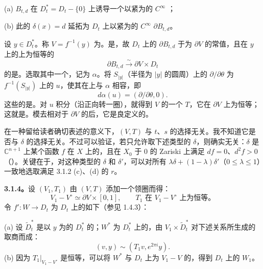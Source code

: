 (a) $B_{t,d}$ 在 $D_t^*=D_t-\{0\}$ 上诱导一个以紧为的 $C^\infty$ ；

(b) 此的 $\delta(x)=d$ 延拓为 $D_t$ 上以紧为的 $C^\infty$  $\partial B_{t,d}$。

设 $y\in D_t^*$。称 $V=f^{-1}(y)$ 为。是，故 $D_t$ 上的 $\partial B_{t,d}$ 于为 $\partial V$ 的常值，且在 $y$ 上的上为恒等的
\[
 \partial B_{t,d}\xrightarrow{\sim}\partial V\times D_t
\]
的是。选取其中一个，记为 $\alpha$。将 $S_{|y|}$（半径为 $|y|$ 的圆周）上的 $\partial/\partial\theta$ 为 $f^{-1}(S_{|y|})$ 上的 $u$，使其在上与 $\alpha$ 相容，即
\[
 d\alpha(u)=(\partial/\partial\theta,0).
\]
这些的是。对 $u$ 积分（沿正向转一圈），就得到 $V$ 的一个 $T$，它在 $\partial V$ 上为恒等；这就是。模去相对于 $\partial V$ 的后，它是良定义的。

在一种留给读者确切表述的意义下，$(V,T)$ 与 $t$、$s$ 的选择无关。我不知道它是否与 $\delta$ 的选择无关。不过可以验证，若只允许取下述类型的 $\delta$，则确实无关：$\delta$ 是 $\mathbb C^{n+1}$ 上某个函数 $f$ 在 $X$ 上的，且在 $X_0$ 于 $0$ 的 Zariski 上满足 $df=0$、$d^2f>0$（）。关键在于，对这种类型的 $\delta$ 和 $\delta'$，可以对所有 $\lambda\delta+(1-\lambda)\delta'$（$0\leq\lambda\leq1$）一致地选取满足 3.1.2 (c)、(d) 的 $r$。

\textbf{3.1.4。}设 $(V_1,T_1)$ 由 $(V,T)$ 添加一个领圈而得：
\[
 V_1-V^\circ\simeq\partial V\times[0,1],\qquad
 T_1\text{ 在 }V_1-V^\circ\text{ 上为恒等。}
\]
令 $f':W\to D_t$ 为 $D_t$ 上的如下（参见 1.4.3）：

(a) 设 $\widetilde D_t^*$ 是以 $y$ 为的 $D_t^*$ 的；$W^*$ 为 $D_t^*$ 上的，由 $V_1\times\widetilde D_t^*$ 对下述关系所生成的取商而成：
\[
 (v,y)\sim(T_1v,e^{2\pi i}y).
\]
(b) 因为 $T_1|_{V_1-V^\circ}$ 是恒等，可以将 $W^*$ 与 $D_t$ 上为 $V_1-V$ 的，得到 $D_t$ 上的 $W_1$。

